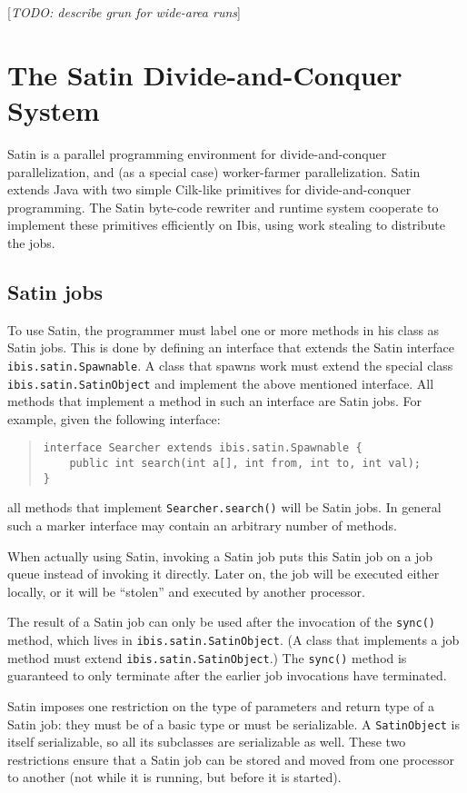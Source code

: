 \documentclass[10pt]{article}
\newcommand{\mysection}[1]{\section{#1}\label{#1}}
\newcommand{\mysubsection}[1]{\subsection{#1}\label{#1}}
\newcommand{\remark}[1]{[\emph{#1}]}
\begin{document}
\remark{TODO: describe grun for wide-area runs}

\mysection{The Satin Divide-and-Conquer System}

Satin is a parallel programming environment for divide-and-conquer
parallelization, and (as a special case) worker-farmer parallelization.
Satin extends Java with two simple Cilk-like primitives for
divide-and-conquer programming.  The Satin byte-code rewriter and
runtime system cooperate to implement these primitives efficiently on
Ibis, using work stealing to distribute the jobs.

\mysubsection{Satin jobs}

To use Satin, the programmer must label one or more methods in his class
as Satin jobs. This is done by defining an interface that extends
the Satin interface \texttt{ibis.satin.Spawnable}.
A class that spawns work must extend the special class
\texttt{ibis.satin.SatinObject} and implement the above mentioned interface.
All methods that implement a method in such an
interface are Satin jobs. For example, given the following interface:

\begin{quote}
\begin{verbatim}
interface Searcher extends ibis.satin.Spawnable {
    public int search(int a[], int from, int to, int val);
}
\end{verbatim}
\end{quote}
\noindent
all methods that implement \texttt{Searcher.search()} will be Satin jobs.
In general such a marker interface may contain an arbitrary number
of methods.

When actually using Satin, invoking a Satin job puts this Satin job
on a job queue instead of invoking it directly.
Later on, the job will be executed either locally, or it will be
``stolen'' and executed by another processor.

The result of a Satin job can only be used after the invocation
of the \texttt{sync()} method, which lives in \texttt{ibis.satin.SatinObject}.
(A class that implements a job method must extend
\texttt{ibis.satin.SatinObject}.)
The \texttt{sync()}
method is guaranteed to only terminate after the earlier job
invocations have terminated.

Satin imposes one restriction on the type of parameters and return type
of a Satin job: they must be of a basic type or must be serializable.
A \texttt{SatinObject} is itself serializable, so all its subclasses
are serializable as well.
These two restrictions ensure that a Satin job can be stored and
moved from one processor to another (not while it is running, but before
it is started).
\end{document}

